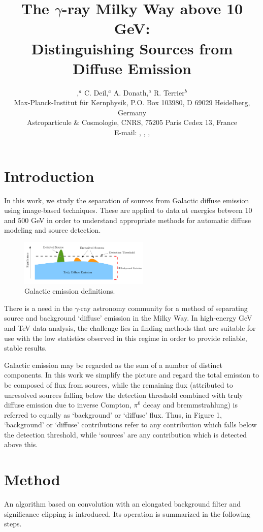 \documentclass{PoS}
\title{The $\gamma$-ray Milky Way above 10 GeV:\\
Distinguishing Sources from Diffuse Emission}
\author{\speaker{E. Owen},$^a$ C. Deil,$^{a}$ A. Donath,$^{a}$ R. Terrier$^{b}$\\
\llap{$^a$}Max-Planck-Institut f\"{u}r Kernphysik, P.O. Box 103980, D
69029 Heidelberg, Germany\\
\llap{$^b$}Astroparticule \& Cosmologie, CNRS, 75205 Paris Cedex 13, France\\
E-mail: \email{ellis.owen@mpi-hd.mpg.de}, \email{christoph.deil@mpi-hd.mpg.de}, \email{axel.donath@mpi-hd.mpg.de}, \email{terrier@apc.univ-paris7.fr}}
\begin{document}
\section{Introduction}

In this work, we study the separation of sources from Galactic diffuse emission using image-based techniques. These are applied to data at energies between 10 and 500 GeV in order to understand appropriate methods for automatic diffuse modeling and source detection.

\begin{figure}
\vspace{-10pt}
  \centering
      \includegraphics[width=0.55\textwidth]{figures/definitions.png}
  \caption{Galactic emission definitions.}
\vspace{-15pt}
\end{figure}

There is a need in the $\gamma$-ray astronomy community for a method of separating source and background `diffuse' emission in the Milky Way. In high-energy GeV and TeV data analysis, the challenge lies in finding methods that are suitable for use with the low statistics observed in this regime in order to provide reliable, stable results.

Galactic emission may be regarded as the sum of a number of distinct components. In this work we simplify the picture and regard the total emission to be composed of flux from sources, while the remaining flux (attributed to unresolved sources falling below the detection threshold combined with truly diffuse emission due to inverse Compton, $\pi^0$ decay and bremmstrahlung) is referred to equally as `background' or `diffuse' flux. Thus, in Figure 1, `background' or `diffuse' contributions refer to any contribution which falls below the detection threshold, while `sources' are any contribution which is detected above this.

\section{Method}

An algorithm based on convolution with an elongated background filter and significance clipping is introduced. Its operation is summarized in the following steps.
\end{document}
